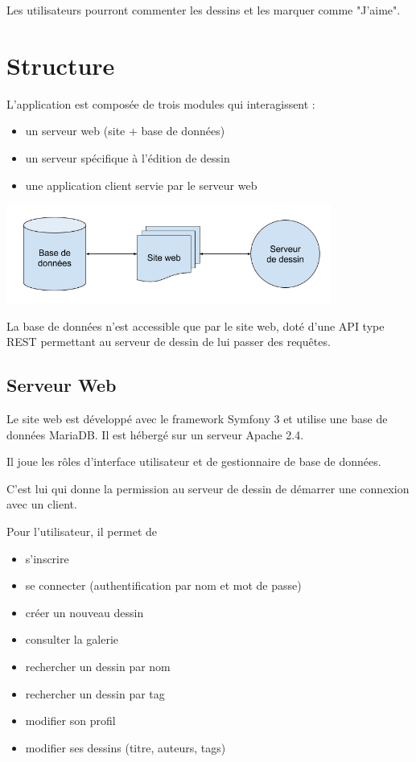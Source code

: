 \documentclass[a4paper]{article}
\begin{document}
Les utilisateurs pourront commenter les dessins et les marquer comme "J'aime".

\section{Structure}
L'application est composée de trois modules qui interagissent :
\begin{itemize}
	\item un serveur web (site + base de données)
	\item un serveur spécifique à l'édition de dessin
	\item une application client servie par le serveur web
\end{itemize}

\begin{center}
	\includegraphics[width=0.8\textwidth]{sketcher_global_structure.png}
\end{center}

La base de données n'est accessible que par le site web, doté d'une API type REST permettant au serveur de dessin de lui passer des requêtes.

\subsection{Serveur Web}
Le site web est développé avec le framework Symfony 3 et utilise une base de données MariaDB. Il est hébergé sur un serveur Apache 2.4.

Il joue les rôles d'interface utilisateur et de gestionnaire de base de données.

C'est lui qui donne la permission au serveur de dessin de démarrer une connexion avec un client.

Pour l'utilisateur, il permet de
\begin{itemize}
	\item s'inscrire
	\item se connecter (authentification par nom et mot de passe)
	\item créer un nouveau dessin
	\item consulter la galerie
	\item rechercher un dessin par nom
	\item rechercher un dessin par tag
	\item modifier son profil
	\item modifier ses dessins (titre, auteurs, tags)
\end{itemize}
\end{document}
